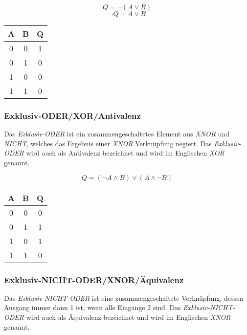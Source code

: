 \documentclass[a4paper, 12pt]{report}
\begin{document}
\begin{center}
	\begin{equation}
		Q = \neg(A \lor B)
	\end{equation}
	\begin{equation}
		\neg Q = A \lor B
	\end{equation}
   \begin{tabular}{ | c | c || c | }
    	\hline
    	A & B & Q \\ \hline
    	0 & 0 & 1 \\ \hline
    	0 & 1 & 0 \\ \hline
    	1 & 0 & 0 \\ \hline
    	1 & 1 & 0 \\
    	\hline
    \end{tabular}
\end{center}

\subsubsection{Exklusiv-ODER/XOR/Antivalenz}

Das \emph{Exklusiv-ODER} ist ein zusammengeschaltetes Element aus \emph{XNOR}
und \emph{NICHT}, welches das Ergebnis einer \emph{XNOR} Verknüpfung negiert.
Das \emph{Exklusiv-ODER} wird auch als Antivalenz bezeichnet und wird im
Englischen \emph{XOR} genannt.

\begin{center}
	\begin{equation}
		Q = (\neg A \land B) \lor (A \land \neg B)
	\end{equation}
   \begin{tabular}{ | c | c || c | }
    	\hline
    	A & B & Q \\ \hline
    	0 & 0 & 0 \\ \hline
    	0 & 1 & 1 \\ \hline
    	1 & 0 & 1 \\ \hline
    	1 & 1 & 0 \\
    	\hline
    \end{tabular}
\end{center}

\subsubsection{Exklusiv-NICHT-ODER/XNOR/Äquivalenz}

Das \emph{Exklusiv-NICHT-ODER} ist eine zusammengeschaltete Verknüpfung, dessen
Ausgang immer dann 1 ist, wenn alle Eingänge 2 sind. Das
\emph{Exklusiv-NICHT-ODER} wird auch als Äquivalenz bezeichnet und wird im
Englischen \emph{XNOR} genannt.
\end{document}
